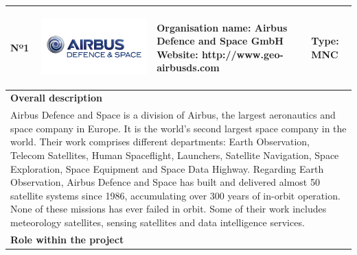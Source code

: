 \begin{longtable}[H]{|p{0.7cm}|p{4cm}|p{7cm}|p{1.3cm}|}
	\hline
	\begin{center} Nº1 \end{center} & \begin{center} \includegraphics[scale=0.09]{./logos/Airbus-defence-and-space-logo} \end{center} & \begin{center} \textbf{Organisation name:} Airbus Defence and Space GmbH \newline \textbf{Website:} http://www.geo-airbusds.com \end{center} & \begin{center} Type: \newline MNC \end{center} \\ \hline
	
	\multicolumn{4}{|p{13cm}|}{\textbf{Overall description}}  \\ \hline
	
	\multicolumn{4}{|p{14.5cm}|}{Airbus Defence and Space is a division of Airbus, the largest aeronautics and space company in Europe. It is the world's second largest space company in the world. Their work comprises different departments: Earth Observation, Telecom Satellites, Human Spaceflight, Launchers, Satellite Navigation, Space Exploration, Space Equipment and Space Data Highway. Regarding Earth Observation, Airbus Defence and Space has built and delivered almost 50 satellite systems since 1986, accumulating over 300 years of in-orbit operation. None of these missions has ever failed in orbit. Some of their work includes meteorology satellites, sensing satellites and data intelligence services.}  \\ \hline
	
	\multicolumn{4}{|p{13cm}|}{\textbf{Role within the project}}   \\ \hline
	

\end{longtable}
